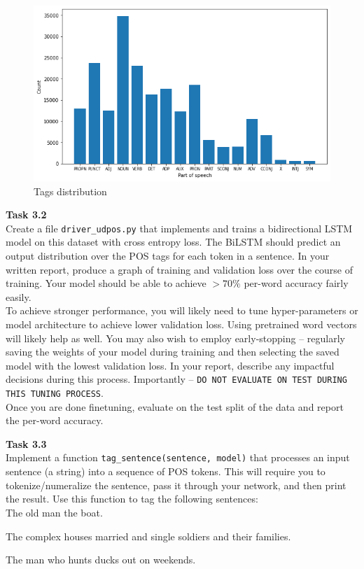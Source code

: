 \documentclass[12pt,article]{article}
\newenvironment{task}[2][Task]
    { \begin{mdframed}[backgroundcolor=gray!20] \textbf{#1 #2} \\}
    {  \end{mdframed}}
\begin{document}
\begin{figure}[H]
    \centering
    \includegraphics[scale=0.5]{tags_dist.png} \par
    \caption{Tags distribution}
    \label{fig:tag-dist}
\end{figure}


\newpage
\begin{task}{3.2} 
Create a file \texttt{driver\_udpos.py} that implements and trains a bidirectional LSTM model on this dataset with cross entropy loss. The BiLSTM should predict an output distribution over the POS tags for each token in a sentence. In your written report, produce a graph of training and validation loss over the course of training. Your model should be able to achieve $>70\%$ per-word accuracy fairly easily. \\[5pt] 

To achieve stronger performance, you will likely need to tune hyper-parameters or model architecture to achieve lower validation loss. Using pretrained word vectors will likely help as well. You may also wish to employ early-stopping -- regularly saving the weights of your model during training and then selecting the saved model with the lowest validation loss. In your report, describe any impactful decisions during this process. Importantly -- \texttt{DO NOT EVALUATE ON TEST DURING THIS TUNING PROCESS}.\\[5pt]

Once you are done finetuning, evaluate on the test split of the data and report the per-word accuracy. 
\end{task}

\begin{task}{3.3} 
Implement a function \texttt{tag\_sentence(sentence, model)} that processes an input sentence (a string) into a sequence of POS tokens. This will require you to tokenize/numeralize the sentence, pass it through your network, and then print the result. Use this function to tag the following sentences:\\[5pt]

The old man the boat.

The complex houses married and single soldiers and their families.

The man who hunts ducks out on weekends.    
\end{task}



\end{document}
